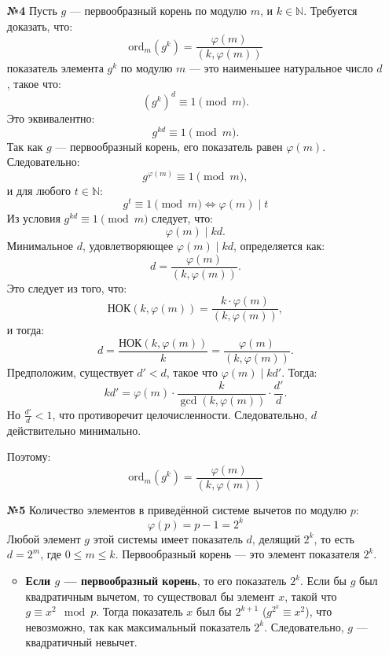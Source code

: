 \documentclass[a4paper]{article}
\renewcommand{\phi}{\varphi}
\renewcommand{\leq}{\leqslant}
\begin{document}
\begin{enumerate}
    \item[\textbf{№4}]
    Пусть \( g \) — первообразный корень по модулю \( m \), и \( k \in \mathbb{N} \). Требуется доказать, что:
    \[
    \text{ord}_m(g^k) = \frac{\varphi(m)}{(k, \varphi(m))}
    \]
    показатель элемента \( g^k \) по модулю \( m \) — это наименьшее натуральное число \( d \), такое что:
    \[
    (g^k)^d \equiv 1 \pmod{m}.
    \]
    Это эквивалентно:
    \[
    g^{kd} \equiv 1 \pmod{m}.
    \]
    Так как \( g \) — первообразный корень, его показатель равен \( \varphi(m) \). Следовательно:
    \[
    g^{\varphi(m)} \equiv 1 \pmod{m},
    \]
    и для любого \( t \in \mathbb{N} \):
    \[
    g^t \equiv 1 \pmod{m} \iff \varphi(m) \mid t
    \]
    Из условия \( g^{kd} \equiv 1 \pmod{m} \) следует, что:
    \[
    \varphi(m) \mid kd.
    \]
    Минимальное \( d \), удовлетворяющее \( \varphi(m) \mid kd \), определяется как:
    \[
    d = \frac{\varphi(m)}{(k, \varphi(m))}.
    \]
    Это следует из того, что:
    \[
    \text{НОК}(k, \varphi(m)) = \frac{k \cdot \varphi(m)}{(k, \varphi(m))},
    \]
    и тогда:
    \[
    d = \frac{\text{НОК}(k, \varphi(m))}{k} = \frac{\varphi(m)}{(k, \varphi(m))}.
    \]
    Предположим, существует \( d' < d \), такое что \( \varphi(m) \mid kd' \). Тогда:
    \[
    kd' = \varphi(m) \cdot \frac{k}{\gcd(k, \varphi(m))} \cdot \frac{d'}{d}.
    \]
    Но \( \frac{d'}{d} < 1 \), что противоречит целочисленности. Следовательно, \( d \) действительно минимально.

    Поэтому:
    $$\text{ord}_m(g^k) = \frac{\varphi(m)}{(k, \varphi(m))}$$

    \item[\textbf{№5}]Количество элементов в приведённой системе вычетов по модулю $p$: 
    \[\phi(p)= p - 1 = 2^k \]
    Любой элемент \( g \) этой системы имеет показатель \( d \), делящий \( 2^k \), то есть \( d = 2^m \), где \( 0 \leq m \leq k \). Первообразный корень — это элемент показателя \( 2^k \).

    \begin{itemize}
        \item \textbf{Если \( g \) — первообразный корень},
         то его показатель \( 2^k \). Если бы \( g \) был квадратичным вычетом, 
         то существовал бы элемент \( x \), такой что \( g \equiv x^2 \mod p \).
          Тогда показатель \( x \) был бы \( 2^{k + 1} \) ($g^{2^k} \equiv x^2$), что невозможно, 
          так как максимальный показатель \( 2^k \).
           Следовательно, \( g \) — квадратичный невычет.
        

\end{itemize}
\end{enumerate}
\end{document}
